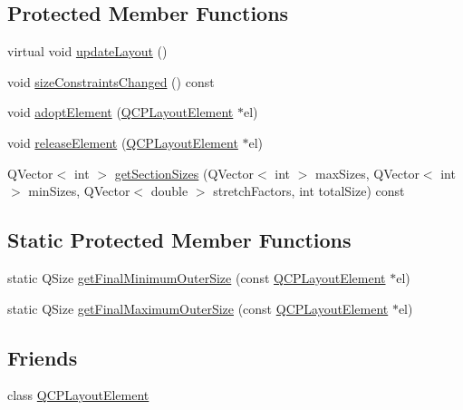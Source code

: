 \subsection*{Protected Member Functions}
\begin{DoxyCompactItemize}
\item 
virtual void \mbox{\hyperlink{class_q_c_p_layout_a165c77f6287ac92e8d03017ad913378b}{update\+Layout}} ()
\item 
void \mbox{\hyperlink{class_q_c_p_layout_aeac66a292f65cf7f8adf94eb92345b3e}{size\+Constraints\+Changed}} () const
\item 
void \mbox{\hyperlink{class_q_c_p_layout_af6dbbc24156a808da29cd1ec031729a3}{adopt\+Element}} (\mbox{\hyperlink{class_q_c_p_layout_element}{Q\+C\+P\+Layout\+Element}} $\ast$el)
\item 
void \mbox{\hyperlink{class_q_c_p_layout_a4afbb4bef0071f72f91afdac4433a18e}{release\+Element}} (\mbox{\hyperlink{class_q_c_p_layout_element}{Q\+C\+P\+Layout\+Element}} $\ast$el)
\item 
Q\+Vector$<$ int $>$ \mbox{\hyperlink{class_q_c_p_layout_a3e77be8006d39f2aafc1313d6e8fc3fd}{get\+Section\+Sizes}} (Q\+Vector$<$ int $>$ max\+Sizes, Q\+Vector$<$ int $>$ min\+Sizes, Q\+Vector$<$ double $>$ stretch\+Factors, int total\+Size) const
\end{DoxyCompactItemize}
\subsection*{Static Protected Member Functions}
\begin{DoxyCompactItemize}
\item 
static Q\+Size \mbox{\hyperlink{class_q_c_p_layout_a864fddc84721f186663faf3683f1fa70}{get\+Final\+Minimum\+Outer\+Size}} (const \mbox{\hyperlink{class_q_c_p_layout_element}{Q\+C\+P\+Layout\+Element}} $\ast$el)
\item 
static Q\+Size \mbox{\hyperlink{class_q_c_p_layout_add49fd6843821a6126914b837ed52e22}{get\+Final\+Maximum\+Outer\+Size}} (const \mbox{\hyperlink{class_q_c_p_layout_element}{Q\+C\+P\+Layout\+Element}} $\ast$el)
\end{DoxyCompactItemize}
\subsection*{Friends}
\begin{DoxyCompactItemize}
\item 
class \mbox{\hyperlink{class_q_c_p_layout_a0790750c7e7f14fdbd960d172655b42b}{Q\+C\+P\+Layout\+Element}}
\end{DoxyCompactItemize}
